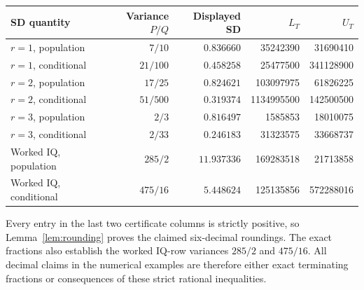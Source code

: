 \begin{center}
\begingroup
\small
\setlength{\tabcolsep}{4pt}
\begin{tabular}{l r r r r}
\hline
SD quantity & Variance \(P/Q\) & Displayed SD & \(L_T\) & \(U_T\) \\
\hline
\(r=1\), population & \(7/10\) & \(0.836660\) & 35242390 & 31690410 \\
\(r=1\), conditional & \(21/100\) & \(0.458258\) & 25477500 & 341128900 \\
\(r=2\), population & \(17/25\) & \(0.824621\) & 103097975 & 61826225 \\
\(r=2\), conditional & \(51/500\) & \(0.319374\) & 1134995500 & 142500500 \\
\(r=3\), population & \(2/3\) & \(0.816497\) & 1585853 & 18010075 \\
\(r=3\), conditional & \(2/33\) & \(0.246183\) & 31323575 & 33668737 \\
Worked IQ, population & \(285/2\) & \(11.937336\) & 169283518 & 21713858 \\
Worked IQ, conditional & \(475/16\) & \(5.448624\) & 125135856 & 572288016 \\
\hline
\end{tabular}
\endgroup
\end{center}
Every entry in the last two certificate columns is strictly positive, so
Lemma~\ref{lem:rounding} proves the claimed six-decimal roundings. The exact
fractions also establish the worked IQ-row variances \(285/2\) and
\(475/16\). All decimal claims in the numerical examples are therefore
either exact terminating fractions or consequences of these strict rational
inequalities.
